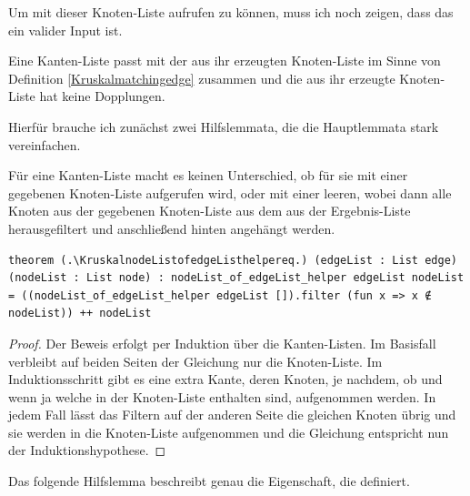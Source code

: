 Um \Kruskalkruskal mit dieser Knoten-Liste aufrufen zu können, muss ich noch zeigen, dass das ein valider Input ist.

\begin{theorem}
  Eine Kanten-Liste passt mit der aus ihr erzeugten Knoten-Liste im Sinne von Definition \ref{Kruskalmatchingedge} zusammen
  und die aus ihr erzeugte Knoten-Liste hat keine Dopplungen.
\end{theorem}

Hierfür brauche ich zunächst zwei Hilfslemmata, die die Hauptlemmata stark vereinfachen.

\begin{lemma}[\KruskalnodeListofedgeListhelpereq]
  Für eine Kanten-Liste macht es keinen Unterschied, ob \KruskalnodeListofedgeListhelper für sie mit einer gegebenen Knoten-Liste aufgerufen wird, oder mit einer leeren,
  wobei dann alle Knoten aus der gegebenen Knoten-Liste aus dem aus der Ergebnis-Liste herausgefiltert und anschließend hinten angehängt werden.
\end{lemma}
\begin{lstlisting}
theorem (.\KruskalnodeListofedgeListhelpereq.) (edgeList : List edge) (nodeList : List node) : nodeList_of_edgeList_helper edgeList nodeList = ((nodeList_of_edgeList_helper edgeList []).filter (fun x => x ∉ nodeList)) ++ nodeList
\end{lstlisting}
\begin{proof}
  Der Beweis erfolgt per Induktion über die Kanten-Listen.
  Im Basisfall verbleibt auf beiden Seiten der Gleichung nur die Knoten-Liste.
  Im Induktionsschritt gibt es eine extra Kante, deren Knoten, je nachdem, ob und wenn ja welche in der Knoten-Liste enthalten sind, aufgenommen werden.
  In jedem Fall lässt das Filtern auf der anderen Seite die gleichen Knoten übrig und sie werden in die Knoten-Liste aufgenommen
  und die Gleichung entspricht nun der Induktionshypothese.
\end{proof}

Das folgende Hilfslemma beschreibt genau die Eigenschaft, die \KruskalnodeListofedgeList definiert.

